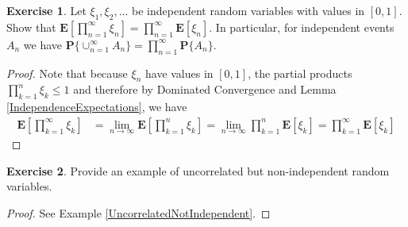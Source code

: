 \documentclass{amsbook}
\theoremstyle{definition}
\newtheorem{xca}{Exercise}
\theoremstyle{remark}
\newcommand{\expectation}[1]{\textbf{E}\left[#1\right]}
\newcommand{\probability}[1]{\textbf{P}\{#1\}}
\begin{document}
\begin{xca}Let $\xi_1, \xi_2, \dots$ be independent random variables with values in
  $[0,1]$.  Show that $\expectation{\prod_{n =1}^\infty \xi_n} =
  \prod_{n=1}^\infty \expectation{\xi_n}$.  In particular, for
  independent events $A_n$ we have $\probability{\cup_{n=1}^\infty
    A_n} = \prod_{n=1}^\infty \probability{A_n}$.
\end{xca}
\begin{proof}
Note that because $\xi_n$ have values in $[0,1]$, the partial products
$\prod_{k=1}^n \xi_k \leq 1$ and therefore by Dominated Convergence
and Lemma \ref{IndependenceExpectations}, we have
\begin{align*}
\expectation{\prod_{k =1}^\infty \xi_k} &= \lim_{n \to \infty}
\expectation{\prod_{k=1}^n \xi_k} = \lim_{n \to \infty}
\prod_{k=1}^n\expectation{ \xi_k} = \prod_{k=1}^\infty \expectation{ \xi_k} 
\end{align*}
\end{proof}

\begin{xca}Provide an example of uncorrelated but non-independent
  random variables.
\end{xca}
\begin{proof}See Example \ref{UncorrelatedNotIndependent}.
\end{proof}
\end{document}
